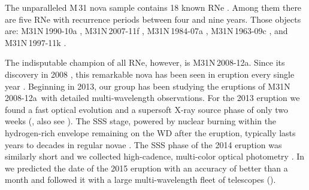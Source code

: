 \documentclass[twocolumn,tighten]{aastex6}
\def\m31{{M\,31}}
\def\nova{{M31N\,2008-12a~}}
\def\novak{{M31N\,2008-12a}}
\newcommand{\oonek}{\citetalias{2014A&A...563L...9D}}
\newcommand{\xonek}{\citetalias{2014A&A...563L...8H}}
\newcommand{\otwok}{\citetalias{2015A&A...580A..45D}}
\newcommand{\xtwok}{\citetalias{2015A&A...580A..46H}}
\newcommand{\halfk}{\citetalias{2015A&A...582L...8H}}
\newcommand{\othreek}{\citetalias{2016ApJ...833..149D}}
\begin{document}
The unparalleled \m31 nova sample contains 18 known RNe \citep{2015ApJS..216...34S,2015ATel.7116....1H,2017ATel10001....1S}. Among them there are five RNe with recurrence periods between four and nine years. Those objects are: M31N\,1990-10a \citep[9\,yr period;][]{2016ATel.9276....1H,2016ATel.9280....1H,2016ATel.9281....1E,2016ATel.9383....1F}, M31N\,2007-11f \citep[9\,yr period;][]{2017ATel10001....1S,2017ATel.9942....1F}, M31N\,1984-07a \citep[8\,yr period][]{2012ATel.4364....1H,2015ApJS..216...34S}, M31N\,1963-09c \citep[5\,yr period][]{1973A&AS....9..347R,2014A&A...563A...2H,2015ATel.8234....1W,2015ATel.8242....1W,2015ATel.8235....1H,2015ATel.8290....1H}, and M31N\,1997-11k \citep[4\,yr period][]{2009ATel.2286....1H,2015ApJS..216...34S}. 

The indisputable champion of all RNe, however, is \novak. Since its discovery in 2008 \citep[by][]{2008Nis}, this remarkable nova has been seen in eruption every single year \citep[][hereafter \othreek, see Table~\ref{eruption_history}]{2016ApJ...833..149D}. Beginning in 2013, our group has been studying the eruptions of \nova with detailed multi-wavelength observations. For the 2013 eruption we found a fast optical evolution \citep[hereafter \oonek]{2014A&A...563L...9D} and a supersoft X-ray source \citep[SSS;][]{2008ASPC..401..139K} phase of only two weeks (\citealt[hereafter \xonek]{2014A&A...563L...8H}, also see \citealt{2014ApJ...786...61T}). The SSS stage, powered by nuclear burning within the hydrogen-rich envelope remaining on the WD after the eruption, typically lasts years to decades in regular novae \citep{2011ApJS..197...31S,2014A&A...563A...2H,2015JHEAp...7..117O}. The SSS phase of the 2014 eruption was similarly short \citep[hereafter \xtwok]{2015A&A...580A..46H} and we collected high-cadence, multi-color optical photometry \citep[hereafter \otwok]{2015A&A...580A..45D}. In \citet[hereafter \halfk]{2015A&A...582L...8H} we predicted the date of the 2015 eruption with an accuracy of better than a month and followed it with a large multi-wavelength fleet of telescopes (\othreek).
\end{document}
